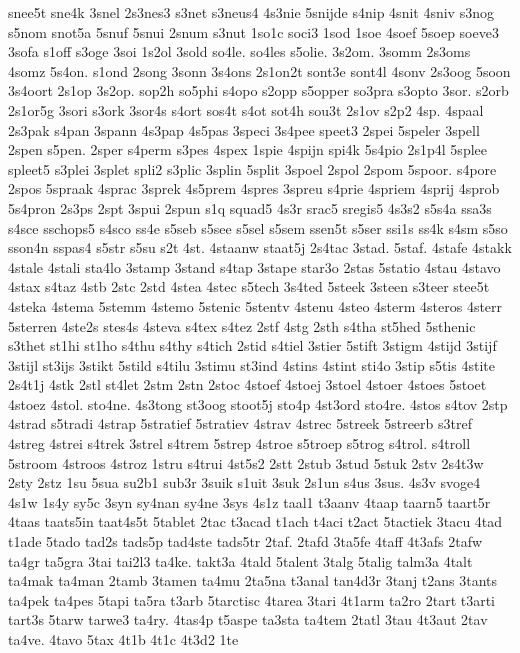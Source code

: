 {snee5t
sne4k
3snel
2s3nes3
s3net
s3neus4
4s3nie
5snijde
s4nip
4snit
4sniv
s3nog
s5nom
snot5a
5snuf
5snui
2snum
s3nut
1so1c
soci3
1sod
1soe
4soef
5soep
soeve3
3sofa
s1off
s3oge
3soi
1s2ol
3sold
so4le.
so4les
s5olie.
3s2om.
3somm
2s3oms
4somz
5s4on.
s1ond
2song
3sonn
3s4ons
2s1on2t
sont3e
sont4l
4sonv
2s3oog
5soon
3s4oort
2s1op
3s2op.
sop2h
so5phi
s4opo
s2opp
s5opper
so3pra
s3opto
3sor.
s2orb
2s1or5g
3sori
s3ork
3sor4s
s4ort
sos4t
s4ot
sot4h
sou3t
2s1ov
s2p2
4sp.
4spaal
2s3pak
s4pan
3spann
4s3pap
4s5pas
3speci
3s4pee
speet3
2spei
5speler
3spell
2spen
s5pen.
2sper
s4perm
s3pes
4spex
1spie
4spijn
spi4k
5s4pio
2s1p4l
5splee
spleet5
s3plei
3splet
spli2
s3plic
3splin
5split
3spoel
2spol
2spom
5spoor.
s4pore
2spos
5spraak
4sprac
3sprek
4s5prem
4spres
3spreu
s4prie
4spriem
4sprij
4sprob
5s4pron
2s3ps
2spt
3spui
2spun
s1q
squad5
4s3r
srac5
sregis5
4s3s2
s5s4a
ssa3s
s4sce
sschops5
s4sco
ss4e
s5seb
s5see
s5sel
s5sem
ssen5t
s5ser
ssi1s
ss4k
s4sm
s5so
sson4n
sspas4
s5str
s5su
s2t
4st.
4staanw
staat5j
2s4tac
3stad.
5staf.
4stafe
4stakk
4stale
4stali
sta4lo
3stamp
3stand
s4tap
3stape
star3o
2stas
5statio
4stau
4stavo
4stax
s4taz
4stb
2stc
2std
4stea
4stec
s5tech
3s4ted
5steek
3steen
s3teer
stee5t
4steka
4stema
5stemm
4stemo
5stenic
5stentv
4stenu
4steo
4sterm
4steros
4sterr
5sterren
4ste2s
stes4s
4steva
s4tex
s4tez
2stf
4stg
2sth
s4tha
st5hed
5sthenic
s3thet
st1hi
st1ho
s4thu
s4thy
s4tich
2stid
s4tiel
3stier
5stift
3stigm
4stijd
3stijf
3stijl
st3ijs
3stikt
5stild
s4tilu
3stimu
st3ind
4stins
4stint
sti4o
3stip
s5tis
4stite
2s4t1j
4stk
2stl
st4let
2stm
2stn
2stoc
4stoef
4stoej
3stoel
4stoer
4stoes
5stoet
4stoez
4stol.
sto4ne.
4s3tong
st3oog
stoot5j
sto4p
4st3ord
sto4re.
4stos
s4tov
2stp
4strad
s5tradi
4strap
5stratief
5stratiev
4strav
4strec
5streek
5streerb
s3tref
4streg
4strei
s4trek
3strel
s4trem
5strep
4stroe
s5troep
s5trog
s4trol.
s4troll
5stroom
4stroos
4stroz
1stru
s4trui
4st5s2
2stt
2stub
3stud
5stuk
2stv
2s4t3w
2sty
2stz
1su
5sua
su2b1
sub3r
3suik
s1uit
3suk
2s1un
s4us
3sus.
4s3v
svoge4
4s1w
1s4y
sy5c
3syn
sy4nan
sy4ne
3sys
4s1z
taal1
t3aanv
4taap
taarn5
taart5r
4taas
taats5in
taat4s5t
5tablet
2tac
t3acad
t1ach
t4aci
t2act
5tactiek
3tacu
4tad
t1ade
5tado
tad2s
tads5p
tad4ste
tads5tr
2taf.
2tafd
3ta5fe
4taff
4t3afs
2tafw
ta4gr
ta5gra
3tai
tai2l3
ta4ke.
takt3a
4tald
5talent
3talg
5talig
talm3a
4talt
ta4mak
ta4man
2tamb
3tamen
ta4mu
2ta5na
t3anal
tan4d3r
3tanj
t2ans
3tants
ta4pek
ta4pes
5tapi
ta5ra
t3arb
5tarctisc
4tarea
3tari
4t1arm
ta2ro
2tart
t3arti
tart3s
5tarw
tarwe3
ta4ry.
4tas4p
t5aspe
ta3sta
ta4tem
2tatl
3tau
4t3aut
2tav
ta4ve.
4tavo
5tax
4t1b
4t1c
4t3d2
1te
}
